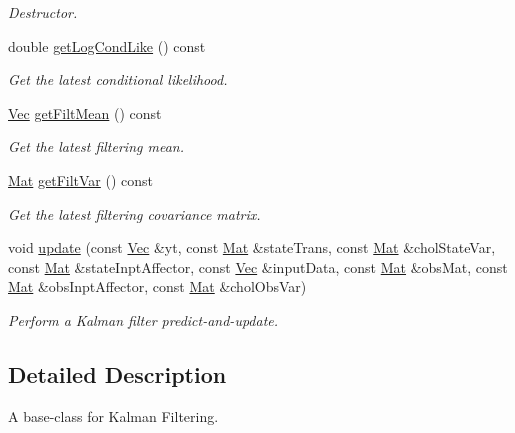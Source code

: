 \begin{DoxyCompactItemize}
\begin{DoxyCompactList}\small\item\em Destructor. \end{DoxyCompactList}\item 
double \hyperlink{classLgssm_abf04a9c7501ab5fa91246963b57721c4}{get\+Log\+Cond\+Like} () const 
\begin{DoxyCompactList}\small\item\em Get the latest conditional likelihood. \end{DoxyCompactList}\item 
\hyperlink{apf__filter_8h_a4c7df05c6f5e8a0d15ae14bcdbc07152}{Vec} \hyperlink{classLgssm_aed914f9b681c5788dc11a49f2e31b74f}{get\+Filt\+Mean} () const 
\begin{DoxyCompactList}\small\item\em Get the latest filtering mean. \end{DoxyCompactList}\item 
\hyperlink{apf__filter_8h_ae601f56a556993079f730483c574356f}{Mat} \hyperlink{classLgssm_a03c6188372603269f0497a66f41d0563}{get\+Filt\+Var} () const 
\begin{DoxyCompactList}\small\item\em Get the latest filtering covariance matrix. \end{DoxyCompactList}\item 
void \hyperlink{classLgssm_a1f21af488dde504b4c01ccd53ef60e2f}{update} (const \hyperlink{apf__filter_8h_a4c7df05c6f5e8a0d15ae14bcdbc07152}{Vec} \&yt, const \hyperlink{apf__filter_8h_ae601f56a556993079f730483c574356f}{Mat} \&state\+Trans, const \hyperlink{apf__filter_8h_ae601f56a556993079f730483c574356f}{Mat} \&chol\+State\+Var, const \hyperlink{apf__filter_8h_ae601f56a556993079f730483c574356f}{Mat} \&state\+Inpt\+Affector, const \hyperlink{apf__filter_8h_a4c7df05c6f5e8a0d15ae14bcdbc07152}{Vec} \&input\+Data, const \hyperlink{apf__filter_8h_ae601f56a556993079f730483c574356f}{Mat} \&obs\+Mat, const \hyperlink{apf__filter_8h_ae601f56a556993079f730483c574356f}{Mat} \&obs\+Inpt\+Affector, const \hyperlink{apf__filter_8h_ae601f56a556993079f730483c574356f}{Mat} \&chol\+Obs\+Var)
\begin{DoxyCompactList}\small\item\em Perform a Kalman filter predict-\/and-\/update. \end{DoxyCompactList}\end{DoxyCompactItemize}


\subsection{Detailed Description}
A base-\/class for Kalman Filtering. 

